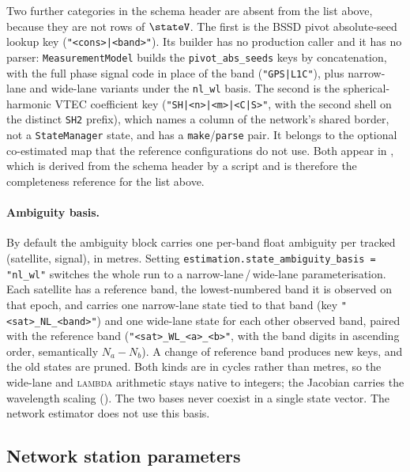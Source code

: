 Two further categories in the schema header are absent from the list
above, because they are not rows of $\stateV$.  The first is the BSSD
pivot absolute-seed lookup key (\texttt{"<cons>|<band>"}).  Its builder
has no production caller and it has no parser: \texttt{MeasurementModel}
builds the \texttt{pivot\_abs\_seeds} keys by concatenation, with the full
phase signal code in place of the band (\texttt{"GPS|L1C"}), plus
narrow-lane and wide-lane variants under the \texttt{nl\_wl} basis.  The
second is the spherical-harmonic VTEC coefficient key
(\texttt{"SH|<n>|<m>|<C|S>"}, with the second shell on the distinct
\texttt{SH2} prefix), which names a column of the network's shared border,
not a \texttt{StateManager} state, and has a \texttt{make}/\texttt{parse}
pair.  It belongs to the optional co-estimated map that the reference
configurations do not use.  Both appear in
,
which is derived from the schema header by a script and is therefore the
completeness reference for the list above.

\paragraph{Ambiguity basis.}
By default the ambiguity block carries one per-band float ambiguity per
tracked (satellite, signal), in metres.  Setting
\texttt{estimation.state\_ambiguity\_basis = "nl\_wl"} switches the
whole run to a narrow-lane\,/\,wide-lane parameterisation.  Each satellite
has a reference band, the lowest-numbered band it is observed on that
epoch, and carries one narrow-lane state tied to that band (key
\texttt{"<sat>\_NL\_<band>"}) and one wide-lane state for each other
observed band, paired with the reference band
(\texttt{"<sat>\_WL\_<a>\_<b>"}, with the band digits in ascending order,
semantically $N_a - N_b$).  A change of reference band produces new keys,
and the old states are pruned.  Both kinds are in cycles rather than
metres, so the wide-lane and \textsc{lambda} arithmetic stays native to
integers; the Jacobian carries the wavelength scaling
().  The two bases never coexist in a single state
vector.  The network estimator does not use this basis.

\subsection{Network station parameters}\label{sec:state-network}

